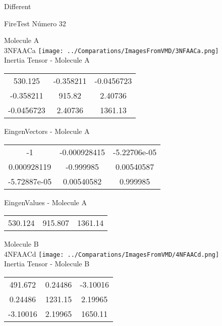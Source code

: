 \begin{center}
\vtab
\vtab
\textcolor{NavyBlue}{\Large Different}
\end{center}

 \newpage

\vtab[-2cm]
\begin{center}
{\large FireTest \tab Número 32}
\end{center}
\begin{multicols}{2}
\begin{center}

Molecule A \\ 
3NFAACa
\texttt{[image: ../Comparations/ImagesFromVMD/3NFAACa.png]}
\\
Inertia Tensor - Molecule A \\
\vtab

\begin{tabular}{|c c c|}
530.125	 & 	-0.358211	 & 	-0.0456723	 \\
-0.358211	 & 	915.82	 & 	2.40736	 \\
-0.0456723	 & 	2.40736	 & 	1361.13
\end{tabular}

\vtab
 EingenVectors - Molecule A     \\
\vtab
\begin{tabular}{|c c c|}
-1	 & 	-0.000928415	 & 	-5.22706e-05	 \\
0.000928119	 & 	-0.999985	 & 	0.00540587	 \\
-5.72887e-05	 & 	0.00540582	 & 	0.999985
\end{tabular}

\vtab
 EingenValues - Molecule A     \\
\vtab
\begin{tabular}{|c c c|}
530.124	 & 	915.807	 & 	1361.14	 \\
\end{tabular}
\columnbreak

Molecule B \\ 
4NFAACd
\texttt{[image: ../Comparations/ImagesFromVMD/4NFAACd.png]}
\\
Inertia Tensor - Molecule B \\
\vtab

\begin{tabular}{|c c c|}
491.672	 & 	0.24486	 & 	-3.10016	 \\
0.24486	 & 	1231.15	 & 	2.19965	 \\
-3.10016	 & 	2.19965	 & 	1650.11
\end{tabular}


\end{center}
\end{multicols}

